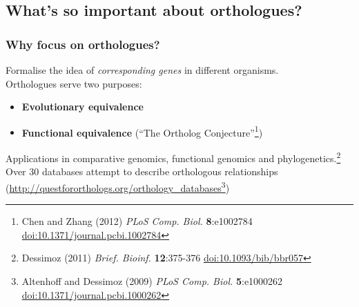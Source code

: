 
\subsection{What's so important about orthologues?}

\begin{frame}
  \frametitle{Why focus on orthologues?}
  Formalise the idea of \textit{corresponding genes} in different organisms. \\
  Orthologues serve two purposes:
  \begin{itemize}
    \item \textbf{Evolutionary equivalence}
    \item \textbf{Functional equivalence} (``The Ortholog Conjecture''\footnote{\tiny{Chen and Zhang (2012) \textit{PLoS Comp. Biol.} \textbf{8}:e1002784 \href{http://dx.doi.org/10.1371/journal.pcbi.1002784}{doi:10.1371/journal.pcbi.1002784}}})
  \end{itemize}
  Applications in comparative genomics, functional genomics and phylogenetics.\footnote{\tiny{Dessimoz (2011) \textit{Brief. Bioinf.} \textbf{12}:375-376 \href{http://dx.doi.org/10.1093/bib/bbr057}{doi:10.1093/bib/bbr057}}} \\
  Over 30 databases attempt to describe orthologous relationships (\href{http://questfororthologs.org/orthology_databases
}{http://questfororthologs.org/orthology\_databases}\footnote{\tiny{Altenhoff and Dessimoz (2009) \textit{PLoS Comp. Biol.} \textbf{5}:e1000262 \href{http://dx.doi.org/10.1371/journal.pcbi.1000262}{doi:10.1371/journal.pcbi.1000262}}})
\end{frame}

